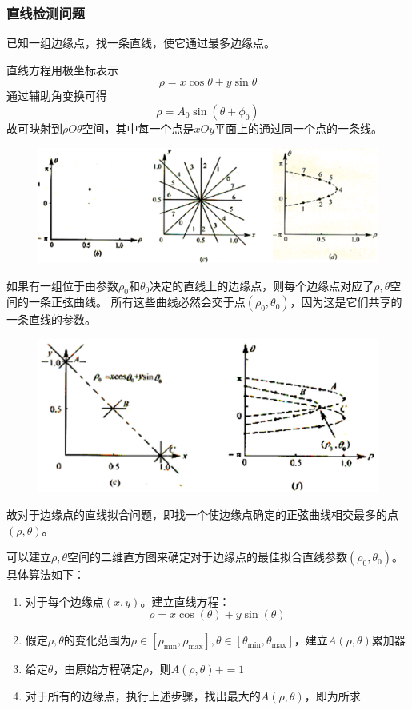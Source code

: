 \subsubsection{直线检测问题}
已知一组边缘点，找一条直线，使它通过最多边缘点。

直线方程用极坐标表示
\[\rho=x\cos\theta+y\sin\theta\]
通过辅助角变换可得
\[\rho=A_0\sin(\theta+\phi_0)\]
故可映射到$\rho O\theta$空间，其中每一个点是$xOy$平面上的通过同一个点的一条线。
\begin{figure}[H]
\centering
\includegraphics[width=0.6\linewidth]{fig/hough.png}
\end{figure}

如果有一组位于由参数$\rho_0$和$\theta_0$决定的直线上的边缘点，则每个边缘点对应了$\rho,\theta$空间的一条正弦曲线。
所有这些曲线必然会交于点$(\rho_0,\theta_0)$，因为这是它们共享的一条直线的参数。
\begin{figure}[H]
\centering
\includegraphics[width=0.6\linewidth]{fig/hough2.png}
\end{figure}

故对于边缘点的直线拟合问题，即找一个使边缘点确定的正弦曲线相交最多的点$(\rho,\theta)$。

可以建立$\rho,\theta$空间的二维直方图来确定对于边缘点的最佳拟合直线参数$(\rho_0,\theta_0)$。
具体算法如下：
\begin{enumerate}
	\item 对于每个边缘点$(x,y)$。建立直线方程：
	\[\rho=x\cos(\theta)+y\sin(\theta)\]
	\item 假定$\rho,\theta$的变化范围为$\rho\in[\rho_{\min},\rho_{\max}],\theta\in[\theta_{\min},\theta_{\max}]$，建立$A(\rho,\theta)$累加器
	\item 给定$\theta$，由原始方程确定$\rho$，则$A(\rho,\theta)+=1$
	\item 对于所有的边缘点，执行上述步骤，找出最大的$A(\rho,\theta)$，即为所求
\end{enumerate}

